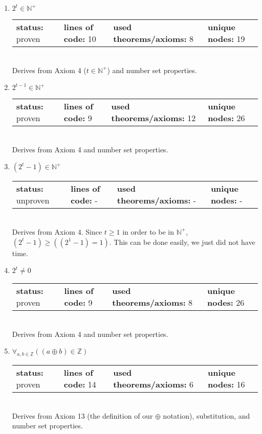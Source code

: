 \documentclass{article}[12pt]
\begin{document}
\begin{enumerate}
\item $2^{t} \in \mathbb{N}^+$ \hfill \\
  \begin{tabular}{l | l | l | l}
    \textbf{status:} proven & \textbf{lines of code:} 10 & \textbf{used theorems/axioms:} 8 & \textbf{unique nodes:} 19
  \end{tabular} \hfill \\
  Derives from Axiom 4 ($t \in \mathbb{N}^+$) and number set properties.
\item $2^{t - 1} \in \mathbb{N}^+$ \hfill \\
  \begin{tabular}{l | l | l | l}
    \textbf{status:} proven & \textbf{lines of code:} 9 & \textbf{used theorems/axioms:} 12 & \textbf{unique nodes:} 26
  \end{tabular} \hfill \\
  Derives from Axiom 4 and number set properties.
\item $\left(2^{t} - 1\right) \in \mathbb{N}^+$ \hfill \\
  \begin{tabular}{l | l | l | l}
    \textbf{status:} unproven & \textbf{lines of code:} - & \textbf{used theorems/axioms:} - & \textbf{unique nodes:} -
  \end{tabular} \hfill \\
  Derives from Axiom 4.  Since $t \geq 1$ in order to be in $\mathbb{N}^+$, $\left(2^{t} - 1\right) \geq \left((2^1 - 1) = 1\right)$.  This can be done easily, we just did not have time.
\item $2^{t} \neq 0$ \hfill \\
  \begin{tabular}{l | l | l | l}
    \textbf{status:} proven & \textbf{lines of code:} 9 & \textbf{used theorems/axioms:} 8 & \textbf{unique nodes:} 26
  \end{tabular} \hfill \\
  Derives from Axiom 4 and number set properties.
\item $\forall_{a, b \in \mathbb{Z}} \left(\left(a \oplus b\right) \in \mathbb{Z}\right)$ \hfill \\
  \begin{tabular}{l | l | l | l}
    \textbf{status:} proven & \textbf{lines of code:} 14 & \textbf{used theorems/axioms:} 6 & \textbf{unique nodes:} 16
  \end{tabular} \hfill \\
  Derives from Axiom 13 (the definition of our $\oplus$ notation), substitution, and number set properties.

\end{enumerate}
\end{document}
